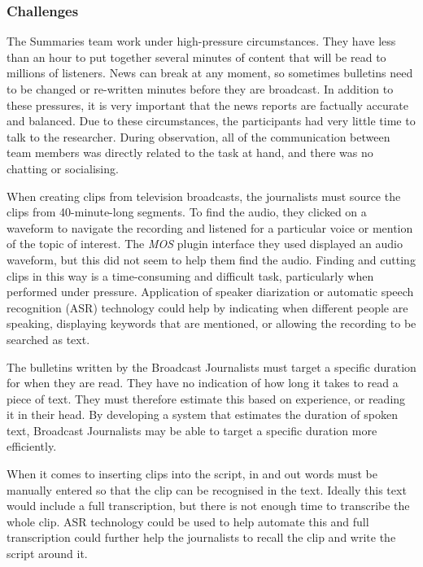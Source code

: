 \subsubsection{Challenges}

The Summaries team work under high-pressure circumstances. They have less than an hour to put together several minutes
of content that will be read to millions of listeners. News can break at any moment, so sometimes bulletins need to be
changed or re-written minutes before they are broadcast. In addition to these pressures, it is very important that the
news reports are factually accurate and balanced.  Due to these circumstances, the participants had very little time to
talk to the researcher. During observation, all of the communication between team members was directly related to the
task at hand, and there was no chatting or socialising.

When creating clips from television broadcasts, the journalists must source the clips from 40-minute-long segments.  To
find the audio, they clicked on a waveform to navigate the recording and listened for a particular voice or mention of
the topic of interest.  The \textit{MOS} plugin interface they used displayed an audio waveform, but this did not seem
to help them find the audio.  Finding and cutting clips in this way is a time-consuming and difficult task,
particularly when performed under pressure.  Application of speaker diarization or automatic speech recognition (ASR)
technology could help by indicating when different people are speaking, displaying keywords that are mentioned, or
allowing the recording to be searched as text.

The bulletins written by the Broadcast Journalists must target a specific duration for when they are read.  They have
no indication of how long it takes to read a piece of text. They must therefore estimate this based on experience, or
reading it in their head.  By developing a system that estimates the duration of spoken text, Broadcast Journalists may
be able to target a specific duration more efficiently. 

When it comes to inserting clips into the script, in and out words must be manually entered so that the clip can be
recognised in the text. Ideally this text would include a full transcription, but there is not enough time to
transcribe the whole clip.  ASR technology could be used to help automate this and full transcription could further
help the journalists to recall the clip and write the script around it.

